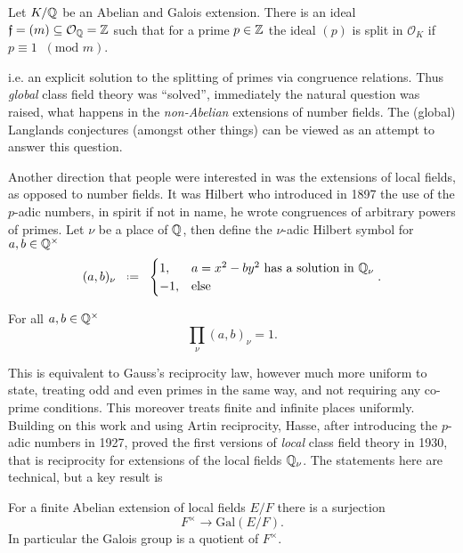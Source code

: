 \begin{Theorem}\label{thm:reciprocity}
	Let \(K/\Q\) be an Abelian and Galois extension. There is an ideal \(\mathfrak{f} = (m)\subseteq \mathcal{O}_\Q = \Z\) such that for a prime \(p\in \Z\) the ideal \((p)\) is split in \(\mathcal{O}_K\) if \(p\equiv 1 \;\; (\text{mod }m)\).
\end{Theorem} 
i.e. an explicit solution to the splitting of primes via congruence relations. Thus \textit{global} class field theory was ``solved'', immediately the natural question was raised, what happens in the \textit{non-Abelian} extensions of number fields. The (global) Langlands conjectures (amongst other things) can be viewed as an attempt to answer this question. 

Another direction that people were interested in was the extensions of local fields, as opposed to number fields. It was Hilbert who introduced in 1897 the use of the \(p\)-adic numbers, in spirit if not in name, he wrote congruences of arbitrary powers of primes. Let \(\nu\) be a place of \(\Q\), then define the \(\nu\)-adic Hilbert symbol for \(a,b\in \Q^\times\)
\[(a,b)_\nu \defeq \begin{cases}
	1, & a= x^2-by^2 \text{ has a solution in }\Q_\nu\\
	-1, &\text{else}
\end{cases} .\]
\begin{Theorem}
	For all \(	a,b\in \Q^\times\) 
	\[\prod_\nu (a,b)_\nu = 1.\]
\end{Theorem}
This is equivalent to Gauss's reciprocity law, however much more uniform to state, treating odd and even primes in the same way, and not requiring any co-prime conditions. This moreover treats finite and infinite places uniformly. Building on this work and using Artin reciprocity, Hasse, after introducing the \(p\)-adic numbers in 1927, proved the first versions of \textit{local} class field theory in 1930, that is reciprocity for extensions of the local fields \(\Q_\nu\). The statements here are technical, but a key result is
\begin{Theorem}
	For a finite Abelian extension of local fields \(E/F\) there is a surjection 
	\[F^\times \to \mathrm{Gal}(E/F).\]
	In particular the Galois group is a quotient of \(F^\times\).
\end{Theorem}


